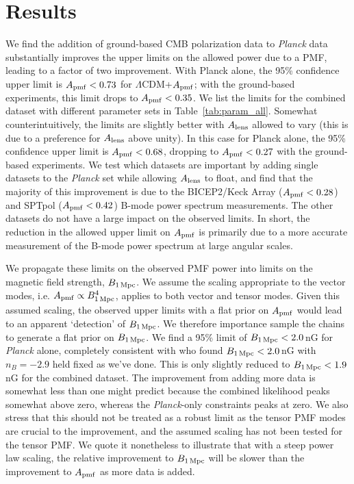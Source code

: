 \documentclass[apj]{emulateapj}
\newcommand{\apmf}{\ensuremath{A_{\rm pmf}}}
\newcommand{\bpmf}{\ensuremath{B_{\rm 1\,Mpc}}}
\newcommand{\alens}{\ensuremath{A_{\rm lens}}}
\newcommand{\lcdm}{\ensuremath{\Lambda}CDM}
\newcommand{\planck}{{\sl Planck}}
\newcommand{\bicepkeck}{BICEP2/Keck Array}
\newcommand{\sptpol}{SPTpol}
\begin{document}
\section{Results}
\label{sec:results}

We find the addition of ground-based CMB polarization data to \planck{} data substantially improves the upper limits on the allowed power due to a PMF, leading to a factor of two improvement. 
With Planck alone, the 95\% confidence upper limit is $\apmf <  0.73$ for \lcdm{}+\apmf{}; with the ground-based experiments, this limit drops to $\apmf <  0.35$. 
We list the limits for the combined dataset  with different parameter sets in Table~\ref{tab:param_all}. 
Somewhat counterintuitively, the limits are slightly better with \alens{} allowed to vary (this is due to a preference for \alens{} above unity). 
In this case for  Planck alone, the 95\% confidence upper limit is $\apmf <  0.68$, dropping to $\apmf <  0.27$ with the ground-based experiments. 
We test which datasets are important by adding single datasets to the \planck{} set while allowing \alens{} to float, and find that the majority of this improvement is due to the \bicepkeck{} ($\apmf <  0.28$) and \sptpol{} ($\apmf <  0.42$) B-mode power spectrum measurements. 
The other datasets do not have a large impact on the observed limits. 
In short, the reduction in the allowed upper limit on \apmf{} is primarily due to a more accurate measurement of the B-mode power spectrum at large angular scales. 



We propagate these limits on the observed PMF power into limits on the magnetic field strength, \bpmf. 
We assume the scaling appropriate to the vector modes, i.e. $\apmf \propto \bpmf^4$,  applies to both vector and tensor modes. 
Given this assumed scaling, the observed upper limits with a flat prior on \apmf{} would lead to an apparent `detection' of \bpmf. 
We therefore importance sample the chains to generate a flat prior on \bpmf. 
We find a 95\% limit of $\bpmf < 2.0$\,nG for \planck{} alone, completely consistent with \citep{planck15-19} who found $\bpmf < 2.0$\,nG with $n_B=-2.9$ held fixed as we've done. 
This is only slightly reduced to $\bpmf < 1.9$\,nG for the combined dataset. 
The improvement from adding more data is somewhat less than one might predict because the combined likelihood peaks somewhat above zero, whereas the \planck{}-only constraints peaks at zero. 
We also stress that this should not be treated as a robust limit as the tensor PMF modes are crucial to the improvement, and the assumed scaling has not been tested for the tensor PMF. 
We quote it nonetheless to illustrate that with a steep power law scaling, the relative improvement to \bpmf{} will be slower than the improvement to \apmf{} as more data is added.
\end{document}
